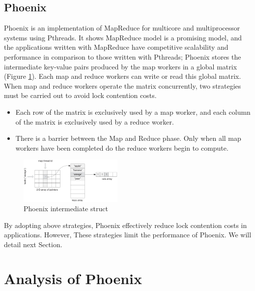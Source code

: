 \subsection{Phoenix}
Phoenix is an implementation of MapReduce for multicore  and multiprocessor systems using Pthreads.
It shows MapReduce model is a promising model, and the applications written with MapReduce have competitive scalability and performance in comparison to those written with Pthreads\cite{ranger2007phoenix};
Phoenix stores the intermediate key-value pairs produced 
by the map workers in a global matrix (Figure \ref{fig:phoenix:intermediate}). 
Each map and reduce workers can write or read this global matrix. 
When map and reduce workers operate the matrix concurrently,
two strategies must be carried out to avoid lock contention costs.
\begin{itemize}
	\item Each row of the matrix is exclusively used by a map worker, and each column of the matrix is exclusively used by a reduce worker. 
	\item There is a barrier between the Map and Reduce phase. Only when all map workers have been completed do the reduce workers begin to compute. 
\end{itemize}

\begin{figure}[!h!t]  
    \centering
    \includegraphics[width=0.45\textwidth]{eps/phoenix_intermediate.eps}
    \caption{Phoenix intermediate struct}
    \label{fig:phoenix:intermediate}
\end{figure}

By adopting above strategies, Phoenix effectively reduce lock contention costs in applications. 
However, These strategies limit the performance of Phoenix.
We will detail next Section. 

\section{Analysis of Phoenix}

